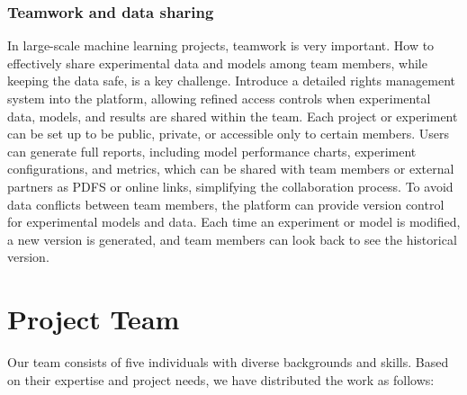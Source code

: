 \documentclass[12pt]{article}
\begin{document}
\subsubsection{Teamwork and data sharing}
In large-scale machine learning projects, teamwork is very important. How to effectively share experimental data and models among team members, while keeping the data safe, is a key challenge. Introduce a detailed rights management system into the platform, allowing refined access controls when experimental data, models, and results are shared within the team. Each project or experiment can be set up to be public, private, or accessible only to certain members. Users can generate full reports, including model performance charts, experiment configurations, and metrics, which can be shared with team members or external partners as PDFS or online links, simplifying the collaboration process. To avoid data conflicts between team members, the platform can provide version control for experimental models and data. Each time an experiment or model is modified, a new version is generated, and team members can look back to see the historical version.

\section{Project Team}

Our team consists of five individuals with diverse backgrounds and skills. Based on their expertise and project needs, we have distributed the work as follows:
\end{document}
